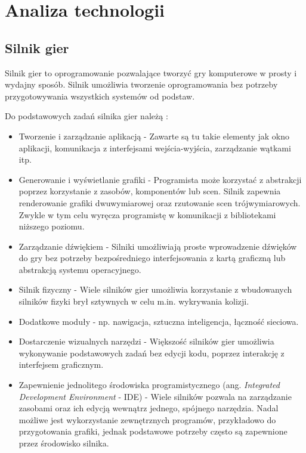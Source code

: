 \chapter{Analiza technologii}\label{ch:tech}
\section{Silnik gier}
Silnik gier to oprogramowanie pozwalające tworzyć gry komputerowe w prosty i wydajny sposób. Silnik umożliwia tworzenie oprogramowania bez potrzeby przygotowywania wszystkich systemów od podstaw. 

Do podstawowych zadań silnika gier należą \cite{pipg4}:
\begin{itemize}
    \item Tworzenie i zarządzanie aplikacją - Zawarte są tu takie elementy jak okno aplikacji, komunikacja z interfejsami wejścia-wyjścia, zarządzanie wątkami itp.
    \item Generowanie i wyświetlanie grafiki - Programista może korzystać z abstrakcji poprzez korzystanie z zasobów, komponentów lub scen. Silnik zapewnia renderowanie grafiki dwuwymiarowej oraz rzutowanie scen trójwymiarowych. Zwykle w tym celu wyręcza programistę w komunikacji z bibliotekami niższego poziomu. 
    \item Zarządzanie dźwiękiem - Silniki umożliwiają proste wprowadzenie dźwięków do gry bez potrzeby bezpośredniego interfejsowania z kartą graficzną lub abstrakcją systemu operacyjnego.
    \item Silnik fizyczny - Wiele silników gier umożliwia korzystanie z wbudowanych silników fizyki brył sztywnych w celu m.in. wykrywania kolizji.
    \item Dodatkowe moduły - np. nawigacja, sztuczna inteligencja, łączność sieciowa.

    \item Dostarczenie wizualnych narzędzi - Większość silników gier umożliwia wykonywanie podstawowych zadań bez edycji kodu, poprzez interakcję z interfejsem graficznym. 
    \item Zapewnienie jednolitego środowiska programistycznego (ang. \emph{Integrated Development Environment} - IDE) - Wiele silników pozwala na zarządzanie zasobami oraz ich edycją wewnątrz jednego, spójnego narzędzia. Nadal możliwe jest wykorzystanie zewnętrznych programów, przykładowo do przygotowania grafiki, jednak podstawowe potrzeby często są zapewnione przez środowisko silnika.
\end{itemize}

